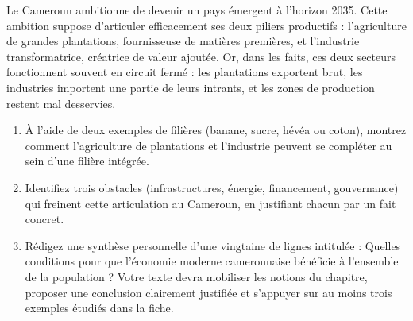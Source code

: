 \documentclass[11pt]{article}
\begin{document}
\begin{exercice}
Le Cameroun ambitionne de devenir un pays émergent à l'horizon 2035. Cette ambition suppose d'articuler efficacement ses deux piliers productifs : l'agriculture de grandes plantations, fournisseuse de matières premières, et l'industrie transformatrice, créatrice de valeur ajoutée. Or, dans les faits, ces deux secteurs fonctionnent souvent en circuit fermé : les plantations exportent brut, les industries importent une partie de leurs intrants, et les zones de production restent mal desservies.

\begin{enumerate}
\item À l'aide de deux exemples de filières (banane, sucre, hévéa ou coton), montrez comment l'agriculture de plantations et l'industrie peuvent se compléter au sein d'une filière intégrée.
\item Identifiez trois obstacles (infrastructures, énergie, financement, gouvernance) qui freinent cette articulation au Cameroun, en justifiant chacun par un fait concret.
\item Rédigez une synthèse personnelle d'une vingtaine de lignes intitulée : \og Quelles conditions pour que l'économie moderne camerounaise bénéficie à l'ensemble de la population ? \fg{} Votre texte devra mobiliser les notions du chapitre, proposer une conclusion clairement justifiée et s'appuyer sur au moins trois exemples étudiés dans la fiche.
\end{enumerate}
\end{exercice}
\end{document}
